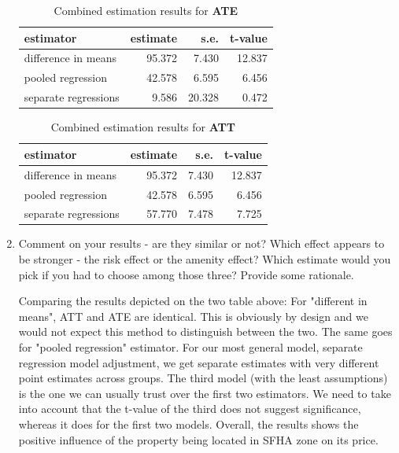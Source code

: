\documentclass[11pt,reqno]{amsart}\usepackage[]{graphicx}\usepackage[]{color}
\newcommand{\ksp}{\vspace{0.1in}}   %
\begin{document}
\begin{enumerate}
\begin{table}[!h]
\centering
\caption{Combined estimation results for \textbf{ATE}} 
\begin{tabular}{lrrr}
  \hline
estimator & estimate & s.e. & t-value \\ 
  \hline
difference in means & 95.372 & 7.430 & 12.837 \\ 
  pooled regression & 42.578 & 6.595 & 6.456 \\ 
  separate regressions & 9.586 & 20.328 & 0.472 \\ 
   \hline
\end{tabular}
\end{table}
\begin{table}[!h]
\centering
\caption{Combined estimation results for \textbf{ATT}} 
\begin{tabular}{lrrr}
  \hline
estimator & estimate & s.e. & t-value \\ 
  \hline
difference in means & 95.372 & 7.430 & 12.837 \\ 
  pooled regression & 42.578 & 6.595 & 6.456 \\ 
  separate regressions & 57.770 & 7.478 & 7.725 \\ 
   \hline
\end{tabular}
\end{table}


\item Comment on your results - are they similar or not? Which effect appears to be stronger - the risk effect or the amenity effect? Which estimate would you pick if you had to choose among those three? Provide some rationale.

\ksp

Comparing the results depicted on the two table above: 
For "different in means", ATT and ATE are identical. This is obviously by design and we would not expect this method to distinguish between the two. The same goes for "pooled regression" estimator. For our most general model, separate regression model adjustment, we get separate estimates with very different point estimates across groups. The third model (with the least assumptions) is the one we can usually trust over the first two estimators. We need to take into account that the t-value of the third does not suggest significance, whereas it does for the first two models. Overall, the results shows the positive influence of the property being located in SFHA zone on its price. 

\end{enumerate}
\end{document}

